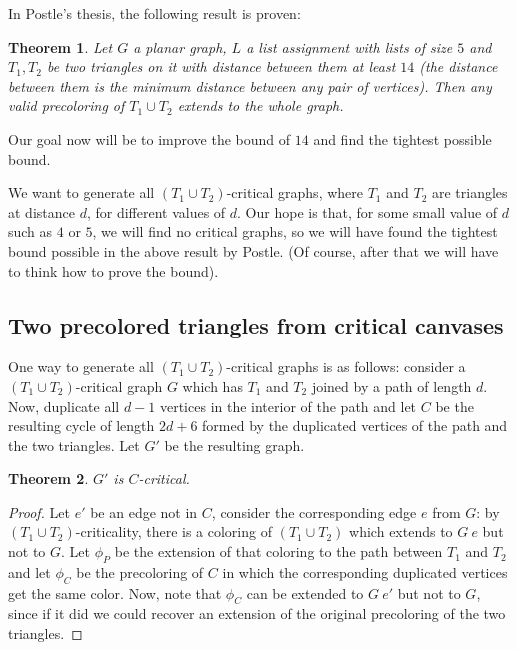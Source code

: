 \documentclass{article}
\newtheorem{theorem}{Theorem}
\begin{document}
In Postle's thesis, the following result is proven: 

\begin{theorem}
Let $G$ a planar graph, $L$ a list assignment with lists of size $5$ and $T_1, T_2$ be two triangles on it with distance between them at least $14$ (the distance between them is the minimum distance between any pair of vertices). Then any valid precoloring of $T_1 \cup T_2$ extends to the whole graph.
\end{theorem}

Our goal now will be to improve the bound of $14$ and find the tightest possible bound.

We want to generate all $(T_1 \cup T_2)$-critical graphs, where $T_1$ and $T_2$ are triangles at distance $d$, for different values of $d$. Our hope is that, for some small value of $d$ such as $4$ or $5$, we will find no critical graphs, so we will have found the tightest bound possible in the above result by Postle. (Of course, after that we will have to think how to prove the bound).

\subsection{Two precolored triangles from critical canvases}

One way to generate all $(T_1 \cup T_2)$-critical graphs is as follows: consider a $(T_1 \cup T_2)$-critical graph $G$ which has $T_1$ and $T_2$ joined by a path of length $d$. Now, duplicate all $d-1$ vertices in the interior of the path and let $C$ be the resulting cycle of length $2d+6$ formed by the duplicated vertices of the path and the two triangles. Let $G'$ be the resulting graph.

\begin{theorem}
$G'$ is $C$-critical.
\end{theorem}

\begin{proof}
Let $e'$ be an edge not in $C$, consider the corresponding edge $e$ from $G$: by $(T_1 \cup T_2)$-criticality, there is a coloring of $(T_1 \cup T_2)$ which extends to $G \ e$ but not to $G$. Let $\phi_P$ be the extension of that coloring to the path between $T_1$ and $T_2$ and let $\phi_C$ be the precoloring of $C$ in which the corresponding duplicated vertices get the same color. Now, note that $\phi_C$ can be extended to $G \ e'$ but not to $G$, since if it did we could recover an extension of the original precoloring of the two triangles.
\end{proof}
\end{document}
